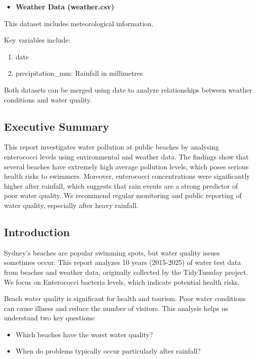 \documentclass[
  11pt,
]{article}
\providecommand{\tightlist}{%
  \setlength{\itemsep}{0pt}\setlength{\parskip}{0pt}}\usepackage{longtable,booktabs,array}
\begin{document}
\begin{itemize}
\tightlist
\item
  \textbf{Weather Data (weather.csv)}
\end{itemize}

This dataset includes meteorological information.

Key variables include:

\begin{enumerate}
\def\labelenumi{\alph{enumi}.}
\tightlist
\item
  date
\item
  precipitation\_mm: Rainfall in millimetres
\end{enumerate}

Both datasets can be merged using date to analyze relationships between
weather conditions and water quality.

\subsection{Executive Summary}\label{executive-summary}

This report investigates water pollution at public beaches by analysing
enterococci levels using environmental and weather data. The findings
show that several beaches have extremely high average pollution levels,
which poses serious health risks to swimmers. Moreover, enterococci
concentrations were significantly higher after rainfall, which suggests
that rain events are a strong predictor of poor water quality. We
recommend regular monitoring and public reporting of water quality,
especially after heavy rainfall.

\subsection{Introduction}\label{introduction}

Sydney's beaches are popular swimming spots, but water quality issues
sometimes occur. This report analyzes 10 years (2015-2025) of water test
data from beaches and weather data, originally collected by the
TidyTuesday project. We focus on Enterococci bacteria levels, which
indicate potential health risks.

Beach water quality is significant for health and tourism. Poor water
conditions can cause illness and reduce the number of visitors. This
analysis helps us understand two key questions:

\begin{itemize}
\tightlist
\item
  Which beaches have the worst water quality?
\item
  When do problems typically occur particularly after rainfall?
\end{itemize}
\end{document}
